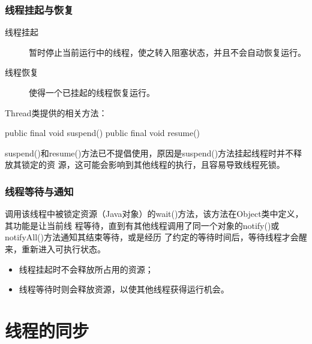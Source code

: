 \begin{frame}[fragile] %
\frametitle{线程挂起与恢复}

\begin{description}
\item[线程挂起] 暂时停止当前运行中的线程，使之转入阻塞状态，并且不会自动恢复运行。
\item[线程恢复] 使得一个已挂起的线程恢复运行。
\end{description}
Thread类提供的相关方法：
\begin{javaCode}
public final void suspend()
public final void resume()
\end{javaCode}


{\kai suspend()和resume()方法已不提倡使用，原因是suspend()方法挂起线程时并不释放其锁定的资
源，这可能会影响到其他线程的执行，且容易导致线程死锁。}
\end{frame}

\begin{frame}[fragile] %
\frametitle{线程等待与通知}


调用该线程中被锁定资源（Java对象）的wait()方法，该方法在Object类中定义，其功能是让当前线
程等待，直到有其他线程调用了同一个对象的notify()或notifyAll()方法通知其结束等待，或是经历
了约定的等待时间后，等待线程才会醒来，重新进入可执行状态。

\pause
{}
\begin{itemize}
\item 线程挂起时不会释放所占用的资源；
\item 线程等待时则会释放资源，以使其他线程获得运行机会。
\end{itemize}
\end{frame}


\section{线程的同步}

